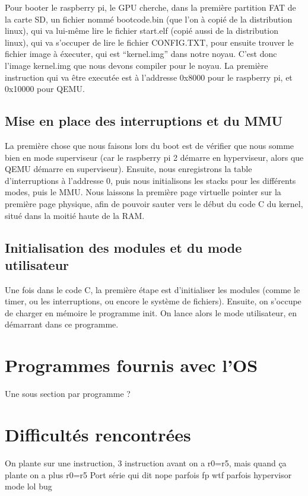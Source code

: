 \documentclass[a4paper]{article}
\begin{document}
Pour booter le raspberry pi, le GPU cherche, dans la première partition FAT de la
carte SD, un fichier nommé bootcode.bin (que l'on à copié de la distribution
linux), qui va lui-même lire le fichier start.elf (copié aussi de la
distribution linux), qui va s'occuper de lire le fichier CONFIG.TXT, pour
ensuite trouver le fichier image à éxecuter, qui est ``kernel.img'' dans notre
noyau. %
C'est donc l'image kernel.img que nous devons compiler pour le noyau. La
première instruction qui va être executée est à l'addresse 0x8000 pour le
raspberry pi, et 0x10000 pour QEMU.

\subsection{Mise en place des interruptions et du MMU}

La première chose que nous faisons lors du boot est de vérifier que nous somme
bien en mode superviseur (car le raspberry pi 2 démarre en hyperviseur, alors
que QEMU démarre en superviseur). Ensuite, nous enregistrons la table
d'interruptions à l'addresse 0, puis nous initialisons les stacks pour les
différents modes, puis le MMU. Nous laissons la première page virtuelle pointer
sur la première page physique, afin de pouvoir sauter vers le début du code C du
kernel, situé dans la moitié haute de la RAM.

\subsection{Initialisation des modules et du mode utilisateur}

Une fois dans le code C, la première étape est d'initialiser les modules (comme
le timer, ou les interruptions, ou encore le système de fichiers). Ensuite, on
s'occupe de charger en mémoire le programme init. On lance alors le mode
utilisateur, en démarrant dans ce programme.


\section{Programmes fournis avec l'OS}
Une sous section par programme ?

\section{Difficultés rencontrées}
On plante sur une instruction, 3 instruction avant on a r0=r5, mais quand ça
plante on a plus r0=r5
Port série qui dit nope parfois
fp wtf parfois
hypervisor mode lol bug
\end{document}
